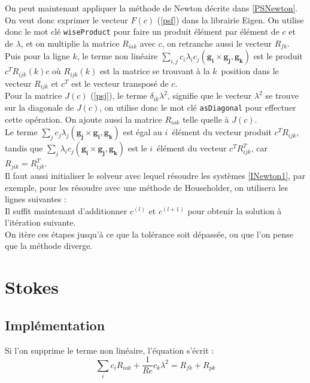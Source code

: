 On peut maintenant appliquer la méthode de Newton décrite dans \ref{PSNewton}. On veut donc exprimer le vecteur $F(c)$ (\ref{psf}) dans la librairie Eigen. On utilise donc le mot clé \texttt{wiseProduct} pour faire un produit élément par élément de $c$ et de $\lambda$, et on multiplie la matrice $R_{iak}$ avec $c$, on retranche aussi le vecteur $R_{fk}$.\\
Puis pour la ligne $k$, le terme non linéaire $\sum_{i,j} c_i\lambda_i c_j (\mathbf{g_i}\times \mathbf{g_j}, \mathbf{g_k})$ est le produit $c^TR_{ijk}(k)c$ où $R_{ijk}(k)$ est la matrice se trouvant à la $k$\ieme\ position dans le vecteur $R_{ijk}$ et $c^T$ est le vecteur transposé de $c$.\\


Pour la matrice $J(c)$ (\ref{psj}), le terme $\delta_{ik}\lambda^2$, signifie que le vecteur $\lambda^2$ se trouve sur la diagonale de $J(c)$, on utilise donc le mot clé \texttt{asDiagonal} pour effectuer cette opération. On ajoute aussi la matrice $R_{iak}$ telle quelle à $J(c)$.\\
Le terme $\sum_j c_j\lambda_j (\mathbf{g_j}\times\mathbf{g_i},\mathbf{g_k})$ est égal au $i$\ieme\ élément du vecteur produit $c^TR_{ijk}$, tandis que $\sum_j\lambda_i c_j (\mathbf{g_i}\times\mathbf{g_j},\mathbf{g_k})$ est le $i$\ieme\ élément du vecteur $c^TR_{ijk}^T$, car $R_{jik}=R_{ijk}^T$.\\


Il faut aussi initialiser le solveur avec lequel résoudre les systèmes \ref{INewton1}, par exemple, pour les résoudre avec une méthode de Householder, on utilisera les lignes suivantes :\\


Il suffit maintenant d'additionner $c^{(l)}$ et $c^{(l+1)}$ pour obtenir la solution à l'itération suivante.\\


On itère ces étapes jusqu'à ce que la tolérance soit dépassée, ou que l'on pense que la méthode diverge.

\section{Stokes}
\subsection{Implémentation}
Si l'on supprime le terme non linéaire, l'équation s'écrit :
\[ \sum_i c_iR_{iak} +\frac{1}{Re}c_k\lambda^2 = R_{fk} + R_{pk} \]

